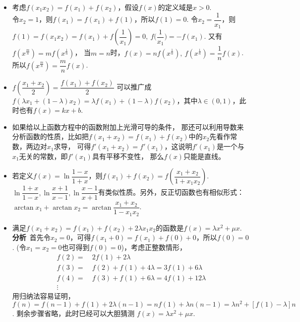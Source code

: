 \begin{itemize}[leftmargin=\inteval{\myitemleftmargin}pt,itemsep=
   \inteval{\myitemitempsep}pt,topsep=\inteval{\myitemtopsep}pt]
\item 考虑$ f(x_1x_2)=f(x_1)+f(x_2) $，假设$ f(x) $的定义域是$ x> 0 $. \\
令$ x_2=1 $，则$ f(x_1)=f(x_1)+f(1) $，所以$ f(1)=0 $. 
令$ x_2=\dfrac{1}{x_1} $，则$ f(1)=f(x_1x_2)=f(x_1)+f(\dfrac{1}{x_1})=0 ,
\ f\Big(\dfrac{1}{x_1}\Big)=-f(x_1) $. 又有
$ f(x^{\frac{m}{n}})=mf(x^{\frac{1}{n}}) $，
当$ m=n $时，$ f(x)=nf(x^{\frac{1}{n}}),\ f(x^{\frac{1}{n}})=\dfrac{1}{n}f(x) $. 
所以$ f(x^{\frac{m}{n}})=\dfrac{m}{n}f(x) $. 

\item $ f\left(\dfrac{x_1+x_2}{2}\right) =\dfrac{f(x_1)+f(x_2)}{2} $
可以推广成$ f\left(\lambda x_1+(1-\lambda)x_2\right) =\lambda f(x_1)+
(1-\lambda)f(x_2) $，其中$ \lambda \in (0,1) $，此时也有$ f(x)=kx+b $. 

\item 如果给以上函数方程中的函数附加上光滑可导的条件，
那还可以利用导数来分析函数的性质，比如把$ f(x_1+x_2)=
f(x_1)+f(x_2) $中的$ x_2 $先看作常数，两边对$ x_1 $求导，
可得$ f'(x_1+x_2)=f'(x_1) $，这说明$ f'(x_1) $是一个与
$ x_1 $无关的常数，即$ f'(x_1) $具有平移不变性，
那么$ f(x) $只能是直线。

\item 若定义$ f(x)=\ln \dfrac{1-x}{1+x} $，则$ f(x_1)+f(x_2)=f\left(\dfrac{x_1+x_2}{1+x_1x_2} \right)  $. 
$ \ln \dfrac{1+x}{1-x},\ln \dfrac{x+1}{x-1},\ln \dfrac{x-1}{x+1}$有类似性质。另外，反正切函数也有相似形式：$ \arctan x_1+\arctan x_2=\arctan\dfrac{x_1+x_2}{1-x_1x_2} $. 

\item 满足$ f(x_1+x_2)= f(x_1)+f(x_2)+2\lambda x_1x_2 $的函数是$ f(x)=\lambda x^2+\mu x $. \\
\textbf{分析}\ 首先令$ x_2=0 $，可得$ f(x_1+0)=f(x_1)+f(0)+0 $，所以$ f(0)=0 $.
(令$ x_1=x_2=0 $也可得到$ f(0)=0 $)，考虑正整数情形，
\begin{align*}
    f(2)=&\ 2f(1)+2\lambda \\
    f(3)=&\ f(2)+f(1)+4\lambda=3f(1)+6 \lambda \\
    f(4)=&\ f(3)+f(1)+6\lambda=4f(1)+12\lambda \\
    \vdots&\  
\end{align*}
用归纳法容易证明，$ f(n)=f(n-1)+f(1)+2\lambda (n-1)=nf(1)+\lambda n(n-1)=
\lambda n^2+[f(1)-\lambda]n $. 剩余步骤省略，此时已经可以大胆猜测
$ f(x)=\lambda x^2+\mu x $. 


\end{itemize}

